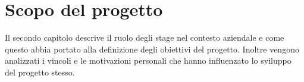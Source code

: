 \chapter{Scopo del progetto}
Il secondo capitolo descrive il ruolo degli stage nel contesto aziendale e come questo abbia portato alla definizione degli obiettivi del progetto.
Inoltre vengono analizzati i vincoli e le motivazioni personali che hanno influenzato lo sviluppo del progetto stesso.






